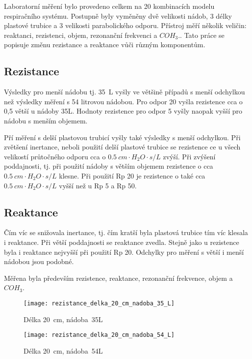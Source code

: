 Laboratorní měření bylo provedeno celkem na 20 kombinacích modelu respiračního systému. Postupně byly vyměněny dvě velikosti nádob, 3 délky plastové trubice a 3 velikosti parabolického odporu. Přístroj měří několik veličin: reaktanci, rezistenci, objem, rezonanční frekvenci a $COH_{3}$.. Tato práce se popisuje změnu rezistance a reaktance vůči různým komponentům.  

 
\subsection{Rezistance}

Výsledky pro menší nádobu tj. \SI{35}{L} vyšly ve většině případů s menší odchylkou než výsledky měření s 54 litrovou nádobou. Pro odpor 20 vyšla rezistence cca o 0,5 větší u nádoby 35L. Hodnoty rezistence pro odpor 5 vyšly naopak vyšší pro nádobu s menším objemem. 

Pří měření s delší plastovou trubicí vyšly také výsledky s menší odchylkou. 
Při zvětšení inertance, neboli použití delší plastové trubice se rezistence ce u všech velikostí průtočného odporu cca o  $\SI{0,5}{ cm\cdot H_{2}O \cdot s/L} $ zvýší. 
Při zvýšení poddajnosti, tj. při použití nádoby s  větším objemem rezistence o cca  $\SI{0,5}{ cm\cdot H_{2}O \cdot s/L} $  klesne. 
Při použití Rp 20 je rezistence o také cca  $\SI{0,5}{ cm\cdot H_{2}O \cdot s/L} $  vyšší než u Rp 5 a Rp 50. 

\subsection{Reaktance}

Čím víc se snižovala inertance, tj. čím kratší byla plastová trubice tím víc klesala i reaktance. Při větší poddajnosti se reaktance zvedla. Stejně jako u rezistence byla i reaktance nejvyšší při použití Rp 20. Odchylky pro měření s větší i menší nádobou jsou podobné. 


Měřena byla především rezistence, reaktance, rezonanční frekvence, objem a $COH_{3}$. 

\begin{figure}[ht]
	\label{img:pic_rezistance_delka_20_cm_nadoba_35_L}
	\begin{center}
		\texttt{[image: rezistance\_delka\_20\_cm\_nadoba\_35\_L]}
		\caption{Délka \SI{20}{cm}, nádoba~35L}
	\end{center}
\end{figure}

\begin{figure}[ht]
	\label{img:pic_rezistance_delka_20_cm_nadoba_54_L}
	\begin{center}
		\texttt{[image: rezistance\_delka\_20\_cm\_nadoba\_54\_L]}
		\caption{Délka \SI{20}{cm}, nádoba~54L}
	\end{center}
\end{figure}

